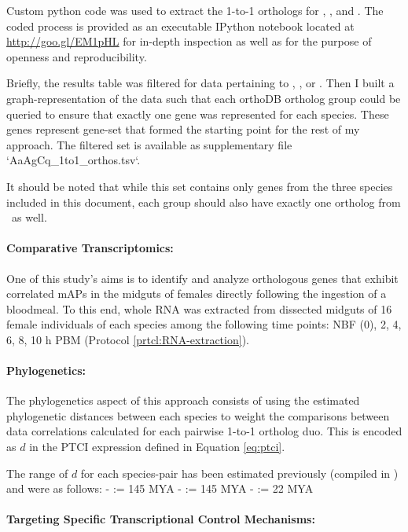 Custom python code was used to extract the 1-to-1 orthologs for \Aa, \Ag, and \Cq. The coded process is provided as an executable IPython notebook located at \url{http://goo.gl/EM1pHL} for in-depth inspection as well as for the purpose of openness and reproducibility.

Briefly, the results table was filtered for data pertaining to \Aa, \Ag, or \Cq.
Then I built a graph-representation of the data such that each orthoDB ortholog group could be queried to ensure that exactly one gene was represented for each species.
These genes represent gene-set that formed the starting point for the rest of my approach.
The filtered set is available as supplementary file `AaAgCq\_1to1\_orthos.tsv`.

It should be noted that while this set contains only genes from the three species included in this document, each group should also have exactly one ortholog from \As\ as well.

\paragraph*{Comparative Transcriptomics:}

One of this study's aims is to identify and analyze orthologous genes that exhibit correlated \glspl{mAP} in the midguts of females directly following the ingestion of a bloodmeal.
To this end, whole RNA was extracted from dissected midguts of 16 female individuals of each species among the following time points: \gls{NBF} (0), 2, 4, 6, 8, 10 h \gls{PBM} (Protocol \ref{prtcl:RNA-extraction}).


\paragraph*{Phylogenetics:}

The phylogenetics aspect of this approach consists of using the estimated phylogenetic distances between each species to weight the comparisons between data correlations calculated for each pairwise 1-to-1 ortholog duo.
This is encoded as $d$ in the \gls{PTCI} expression defined in Equation \ref{eq:ptci}.

The range of  $d$ for each species-pair has been estimated previously (compiled in \cite{Sieglaff2009}) and were as follows:
- \Aa:\Ag = 145 MYA
- \Ag:\Cq = 145 MYA
- \Aa:\Cq = 22 MYA  


\paragraph*{Targeting Specific Transcriptional Control Mechanisms:}

